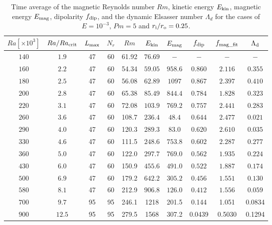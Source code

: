 \begin{table}
\begin{center}
\caption{Time average of the magnetic Reynolds number $Rm$, kinetic energy $E_{\rm kin}$, magnetic energy $E_{\rm mag}$, dipolarity $f_{\rm dip}$, and the dynamic Elsasser number $\Lambda_{d}$ for the cases of $E = 10^{-3}$, $Pm = 5$ and $r_{\rm i}/r_{\rm o} = 0.25$.}
 \label{table:Summary_25}
%
\begin{tabular}{cccccccccc}
    \hline
     $Ra[\times 10^3]$  &  $Ra/Ra_{\rm crit}$& 
     {\color{black} $L_{\rm max}$} & {\color{black} $N_{r}$} & {\color{black} $Rm$} & $E_{\rm kin}$  &  $E_{\rm mag}$ & $f_{\rm dip}$ & $f_{\rm mag\_fit}$ & $\Lambda_{\rm d}$\\
    \hline 
    $140$  & $1.9$ & 47 & 60 & 61.92 &  $76.69$ & $-$ & $-$ & $-$ & $-$\\
    $160$  & $2.2$ & 47 & 60 & 54.34 &  $59.05$ & $958.6$ & $0.860$ & $2.116$ & $0.355$\\
    $180$  & $2.5$ & 47 & 60 & 56.08 &  $62.89$ & $1097$ & $0.867$ & $2.397$ & $0.410$\\
    $200$  & $2.8$ & 47 & 60 & 65.38 &  $85.49$ & $844.4$ & $0.784$ & $1.828$ & $0.323$\\
    $220$  & $3.1$ & 47 & 60 & 72.08 &  $103.9$ & $769.2$ & $0.757$ & $2.441$ & $0.283$\\
    $260$  & $3.6$ & 47 & 60 & 108.7 &  $236.4$ & $48.4$ & $0.644$ & $2.477$ & $0.021$\\
    $290$  & $4.0$ & 47 & 60 & 120.3 &  $289.3$ & $83.0$ & $0.620$ & $2.610$ & $0.035$\\
    $330$  & $4.6$ & 47 & 60 & 111.5 &  $248.6$ & $753.8$ & $0.602$ & $2.287$ & $0.277$\\
    $360$  & $5.0$ & 47 & 60 & 122.0 &  $297.7$ & $769.0$ & $0.562$ & $1.935$ & $0.224$\\
    $430$  & $6.0$ & 47 & 60 & 150.9 &  $455.6$ & $491.0$ & $0.522$ & $1.887$ & $0.174$\\
    $500$  & $6.9$ & 47 & 60 & 179.2 &  $642.2$ & $305.2$ & $0.456$ & $1.551$ & $0.130$\\
    $580$  & $8.1$ & 47 & 60 & 212.9 &  $906.8$ & $126.0$ & $0.412$ & $1.556$ & $0.059$\\
    $700$  & $9.7$ & 95 & 95 & 246.1 &  1218 & 201.5 & 0.144 & 1.051 & 0.0834 \\
    $900$  & $12.5$ & 95 & 95 & 279.5 &  1568 & 307.2 & 0.0439 & 0.5030 & 0.1294 \\
    \hline
  \end{tabular}
 \end{center}
\end{table}